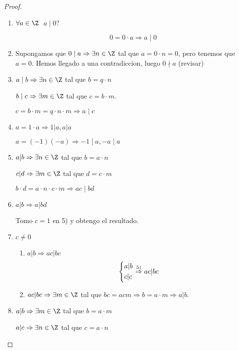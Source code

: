 \begin{proof}
	~\begin{enumerate}
		\item \(\forall  a \in \Z \) \(\; a \mid 0 ?\)

		      \[
			      0 = 0 \cdot a \Rightarrow a \mid 0
		      \]
		\item Supongamos que \(0 \mid a \Rightarrow \exists n \in \Z\) tal que \(a = 0 \cdot n = 0 \), pero tenemos que \(a =  0 \). Hemos llegado a una contradiccion, luego \(0 \nmid a \) (revisar)
		\item \(a \mid b \Rightarrow \exists n \in \Z \) tal que \(b = q \cdot n \)

		      \(b \mid c \Rightarrow \exists m \in \Z \) tal que \(c = b \cdot m \).

		      \(c = b \cdot m = q \cdot n \cdot m \Rightarrow a \mid c \)

		\item \(a = 1 \cdot a \Rightarrow 1| a, a | a\)

		      \(a = (-1)(-a) \Rightarrow -1 \mid a, -a \mid a \)

		\item \(a|b \Rightarrow \exists n \in \Z \) tal que \(b = a \cdot n \)

		      \(c|d \Rightarrow \exists m \in \Z \) tal que \(d = c \cdot m \)

		      \(b \cdot d = a \cdot n \cdot c \cdot m \Rightarrow ac \mid bd \)
		\item \(a|b \Rightarrow a|bd \)

		      Tomo \(c= 1 \) en 5) y obtengo el resultado.
		\item \(c \neq 0\)

		      \begin{enumerate}
			      \item \(a|b \Rightarrow ac | bc \)
			            \[
				            \begin{dcases}
					            a|b \\
					            c|c
				            \end{dcases} \overset{5)}{\Rightarrow} ac|bc
			            \]
			      \item \(ac|bc \Rightarrow \exists m \in \Z \) tal que \(bc = acm \Rightarrow b = a \cdot m \Rightarrow a | b \).
		      \end{enumerate}
		\item \(a | b \Rightarrow \exists m \in \Z \) tal que \(b = a \cdot m \)

		      \(a | c \Rightarrow \exists n \in \Z \) tal que \(c = a \cdot n \)


\end{enumerate}
\end{proof}
